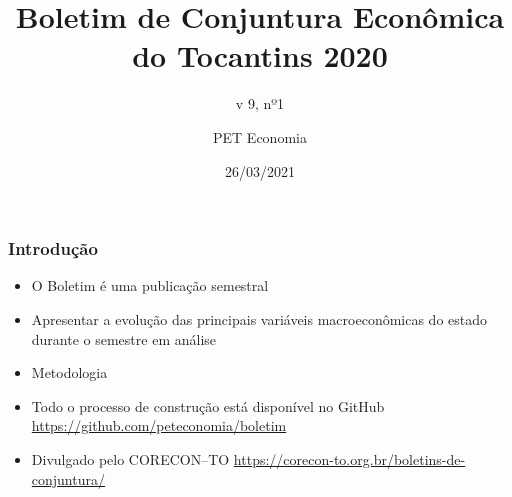 \documentclass[12pt,aspectratio=169]{beamer}
\title{Boletim de Conjuntura Econômica do Tocantins 2020}
\subtitle{v 9, nº1}
\author{PET Economia}
\institute{Universidade Federal do Tocantins}
\date{26/03/2021}
\begin{document}
\begin{frame}
    \titlepage
\end{frame}


\begin{frame}  
\frametitle{Introdução}
\begin{itemize}
\item O Boletim é uma publicação semestral
\item Apresentar a evolução das principais variáveis macroeconômicas do estado durante o semestre em análise
\item Metodologia
\item Todo o processo de construção está disponível no GitHub \url{https://github.com/peteconomia/boletim}
\item Divulgado pelo CORECON--TO \url{https://corecon-to.org.br/boletins-de-conjuntura/}

\end{itemize}
\end{frame}
\end{document}
